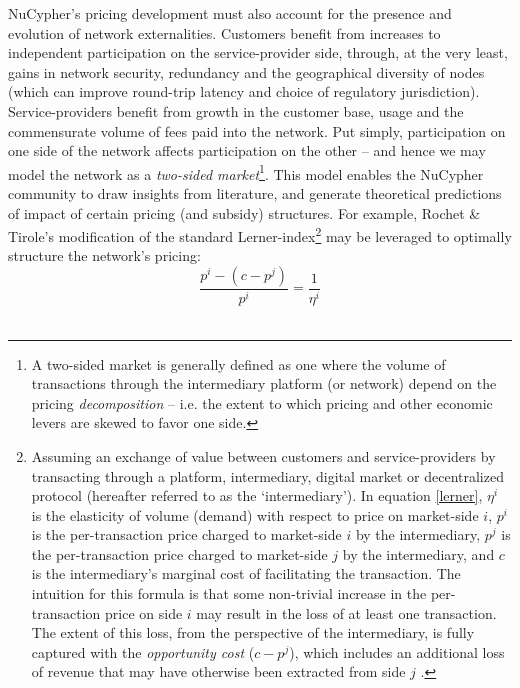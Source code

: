 \documentclass[longbibliography,nofootinbib]{revtex4-1}
\begin{document}
NuCypher’s pricing development must also account for the presence and evolution of network externalities. Customers benefit from increases to independent participation on the service-provider side, through, at the very least, gains in network security, redundancy and the geographical diversity of nodes (which can improve round-trip latency and choice of regulatory jurisdiction). Service-providers benefit from growth in the customer base, usage and the commensurate volume of fees paid into the network. Put simply, participation on one side of the network affects participation on the other – and hence we may model the network as a \textit{two-sided market}\footnote{A two-sided market is generally defined as one where the volume of transactions through the intermediary platform (or network) depend on the pricing \textit{decomposition} – i.e. the extent to which pricing and other economic levers are skewed to favor one side.}. This model enables the NuCypher community to draw insights from literature, and generate theoretical predictions of impact of certain pricing (and subsidy) structures. For example, Rochet \& Tirole's modification of the standard Lerner-index\footnote{Assuming an exchange of value between customers and service-providers by transacting through a platform, intermediary, digital market or decentralized protocol (hereafter referred to as the `intermediary'). In equation \ref{lerner}, $\eta^i$ is the elasticity of volume (demand) with respect to price on market-side $i$, $p^i$ is the per-transaction price charged to market-side $i$ by the intermediary, $p^j$ is the per-transaction price charged to market-side $j$ by the intermediary, and $c$ is the intermediary's marginal cost of facilitating the transaction. The intuition for this formula is that some non-trivial increase in the per-transaction price on side $i$ may result in the loss of at least one transaction. The extent of this loss, from the perspective of the intermediary, is fully captured with the \textit{opportunity cost} ($c - p^j$), which includes an additional loss of revenue that may have otherwise been extracted from side $j$ \cite{RTprogress}.} may be leveraged to optimally structure the network's pricing: \\

\begin{equation}
\label{lerner}
    \frac{p^i - (c - p^j)}{p^i} = \frac{1}{\eta^i}   
\end{equation} \
\end{document}
